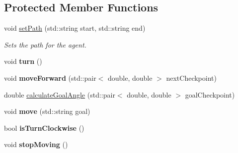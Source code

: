 \subsection*{Protected Member Functions}
\begin{DoxyCompactItemize}
\item 
void \hyperlink{classAgent_a20a0548f91fdfba2727ff8fddc3ce3dc}{set\-Path} (std\-::string start, std\-::string end)
\begin{DoxyCompactList}\small\item\em Sets the path for the agent. \end{DoxyCompactList}\item 
\hypertarget{classAgent_a49e310d66471525dfba98ee4e89e7865}{void {\bfseries turn} ()}\label{classAgent_a49e310d66471525dfba98ee4e89e7865}

\item 
\hypertarget{classAgent_a155537d7cbac8ba6982415e15c8e76a9}{void {\bfseries move\-Forward} (std\-::pair$<$ double, double $>$ next\-Checkpoint)}\label{classAgent_a155537d7cbac8ba6982415e15c8e76a9}

\item 
double \hyperlink{classAgent_a9455180dd9aff369e34e1527bfa6d1a9}{calculate\-Goal\-Angle} (std\-::pair$<$ double, double $>$ goal\-Checkpoint)
\item 
\hypertarget{classAgent_a5f9de8060bab4248d557f454265eee86}{void {\bfseries move} (std\-::string goal)}\label{classAgent_a5f9de8060bab4248d557f454265eee86}

\item 
\hypertarget{classAgent_acf69a5a2725a599c84ae2885d31c6d63}{bool {\bfseries is\-Turn\-Clockwise} ()}\label{classAgent_acf69a5a2725a599c84ae2885d31c6d63}

\item 
\hypertarget{classAgent_add59ed077172c91c9b2dddd4ca319f47}{void {\bfseries stop\-Moving} ()}\label{classAgent_add59ed077172c91c9b2dddd4ca319f47}

\end{DoxyCompactItemize}
